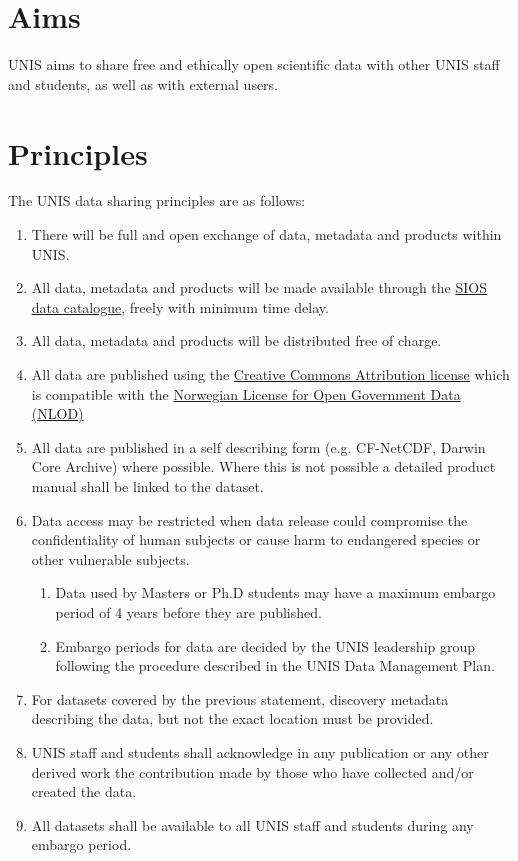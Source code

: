 \documentclass[a4paper,english, 11pt]{article}
\begin{document}
\section{Aims}
\label{s:aims}

UNIS aims to share free and ethically open scientific data with other UNIS staff and students, as well as with external users. 

\section{Principles}
\label{s:principles}

The UNIS data sharing principles are as follows:

\begin{enumerate}
\item There will be full and open exchange of data, metadata and products within UNIS.
\item All data, metadata and products will be made available through the \href{https://sios-svalbard.org/metsis/search}{SIOS data catalogue}, freely with minimum time delay.
\item All data, metadata and products will be distributed free of charge.
\item All data are published using the \href{https://creativecommons.org/licenses/by/4.0/}{Creative Commons Attribution license} which is
compatible with the \href{https://data.norge.no/nlod/en}{Norwegian License for Open Government Data (NLOD)}
\item All data are published in a self describing form (e.g. CF-NetCDF, Darwin Core Archive) where possible. Where this is not possible a detailed product manual shall be linked to the dataset.
\item Data access may be restricted when data release could compromise the confidentiality
of human subjects or cause harm to endangered species or other vulnerable subjects.
\begin{enumerate}
\item Data used by Masters or Ph.D students may have a maximum embargo period of 4 years before
they are published.
\item Embargo periods for data are decided by the UNIS leadership group
following the procedure described in the UNIS Data Management Plan.
\end{enumerate}
\item For datasets covered by the previous statement, discovery metadata describing the data, but not the exact location must be provided.
\item UNIS staff and students shall acknowledge in any publication or any other derived work the contribution made by those who have collected and/or created the data.
\item All datasets shall be available to all UNIS staff and students during any embargo period.
\end{enumerate}
\end{document}
